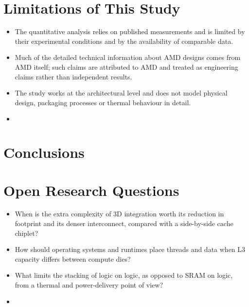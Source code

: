 \section{Limitations of This Study}
\label{sec:limitations}
\begin{itemize}
  \item The quantitative analysis relies on published measurements and is limited by their experimental conditions and by the availability of comparable data.
  \item Much of the detailed technical information about AMD designs comes from AMD itself; such claims are attributed to AMD and treated as engineering claims rather than independent results.
  \item The study works at the architectural level and does not model physical design, packaging processes or thermal behaviour in detail.
  \item {}
\end{itemize}

\section{Conclusions}
\label{sec:conclusions}

\section{Open Research Questions}
\label{sec:open-questions}
\begin{itemize}
  \item When is the extra complexity of 3D integration worth its reduction in footprint and its denser interconnect, compared with a side-by-side cache chiplet?
  \item How should operating systems and runtimes place threads and data when L3 capacity differs between compute dies?
  \item What limits the stacking of logic on logic, as opposed to SRAM on logic, from a thermal and power-delivery point of view?
  \item {}
\end{itemize}
